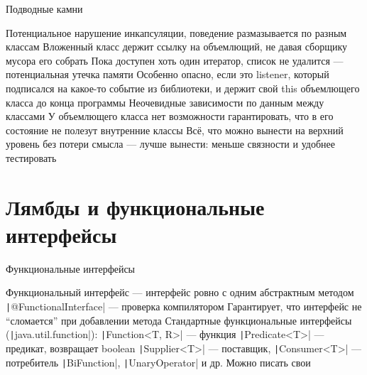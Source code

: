 \documentclass{../../slides-style}
\begin{document}
    \begin{frame}{Подводные камни}
        \begin{outline}
            \1 Потенциальное нарушение инкапсуляции, поведение размазывается по разным классам
            \1 Вложенный класс держит ссылку на объемлющий, не давая сборщику мусора его собрать
                \2 Пока доступен хоть один итератор, список не удалится --- потенциальная утечка памяти
                \2 Особенно опасно, если это listener, который подписался на какое-то событие из библиотеки, и держит свой this объемлющего класса до конца программы
            \1 Неочевидные зависимости по данным между классами
                \2 У объемлющего класса нет возможности гарантировать, что в его состояние не полезут внутренние классы
            \1 Всё, что можно вынести на верхний уровень без потери смысла --- лучше вынести: меньше связности и удобнее тестировать
        \end{outline}
    \end{frame}

    \section{Лямбды и функциональные интерфейсы}

    \begin{frame}{Функциональные интерфейсы}
        \begin{outline}
            \1 Функциональный интерфейс --- интерфейс ровно с одним абстрактным методом
            \1 \texttt|@FunctionalInterface| --- проверка компилятором
                \2 Гарантирует, что интерфейс не \enquote{сломается} при добавлении метода
            \1 Стандартные функциональные интерфейсы (\texttt|java.util.function|):
                \2 \texttt|Function<T, R>| --- функция
                \2 \texttt|Predicate<T>| --- предикат, возвращает boolean
                \2 \texttt|Supplier<T>| --- поставщик, \texttt|Consumer<T>| --- потребитель
                \2 \texttt|BiFunction|, \texttt|UnaryOperator| и др.
            \1 Можно писать свои
        \end{outline}
    \end{frame}
\end{document}
